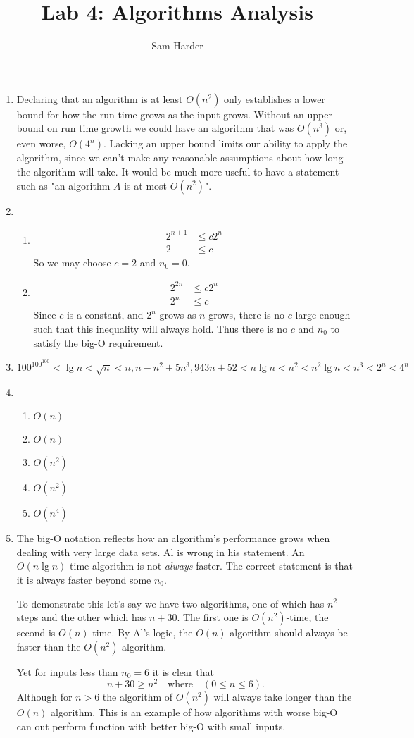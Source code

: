 \documentclass{article}
\title{Lab 4: Algorithms Analysis}
\author{Sam Harder}
\date{}
\begin{document}
	\maketitle	
	\begin{enumerate}
		\item Declaring that an algorithm is at least $O(n^2)$ only establishes a lower bound for how the run time grows as the input grows. Without an upper bound on run time growth we could have an algorithm that was $O(n^3)$ or, even worse, $O(4^n)$. Lacking an upper bound limits our ability to apply the algorithm, since we can't make any reasonable assumptions about how long the algorithm will take. It would be much more useful to have a statement such as "an algorithm $A$ is at most $O(n^2)$". 
		\item
		\begin{enumerate}
			\item 
			\begin{align*}
				2^{n+1} &\leq c2^n \\
				2 &\leq c
			\end{align*}
			So we may choose $c = 2$ and $n_0 = 0$. 
			\item
			\begin{align*}
				2^{2n} &\leq c2^n \\
				2^n  &\leq  c
			\end{align*}
			Since $c$ is a constant, and $2^n$ grows as $n$ grows, there is no $c$ large enough such that this inequality will always hold. Thus there is no $c$ and $n_0$ to satisfy the big-O requirement. 
		\end{enumerate}
		\item 
		\[  100^{100^{100}} < \lg n < \sqrt{n} < n, n-n^2 + 5n^3, 943n + 52<n \lg n <  n^2 <n^2 \lg n < n^3 < 2^n < 4^n   \]
		\item
		\begin{enumerate}
			\item $ O(n) $ 
			\item $ O(n) $
			\item $ O(n^2)$ 
			\item $O(n^2)$
			\item $O(n^4)$
		\end{enumerate}
		\item The big-O notation reflects how an algorithm's performance grows when dealing with very large data sets. Al is wrong in his statement. An $O(n \lg n)$-time algorithm is not \emph{always} faster. The correct statement is that it is always faster beyond some $n_0$. 
		
		 To demonstrate this let's say we have two algorithms, one of which has $n^2$ steps and the other which has $n + 30$. The first one is $O(n^2)$-time, the second is $O(n)$-time. By Al's logic, the $O(n)$ algorithm should always be faster than the $O(n^2)$ algorithm. 
		 
		 Yet for inputs less than $n_0 = 6$ it is clear that \[ n+30 \geq n^2 \quad \text{where} \quad (0 \leq n \leq 6).\]  Although for $n>6$ the algorithm of $O(n^2)$ will always take longer than the $O(n)$ algorithm. This is an example of how algorithms with worse big-O can out perform function with better big-O with small inputs. 
		
		
	\end{enumerate}
\end{document}
